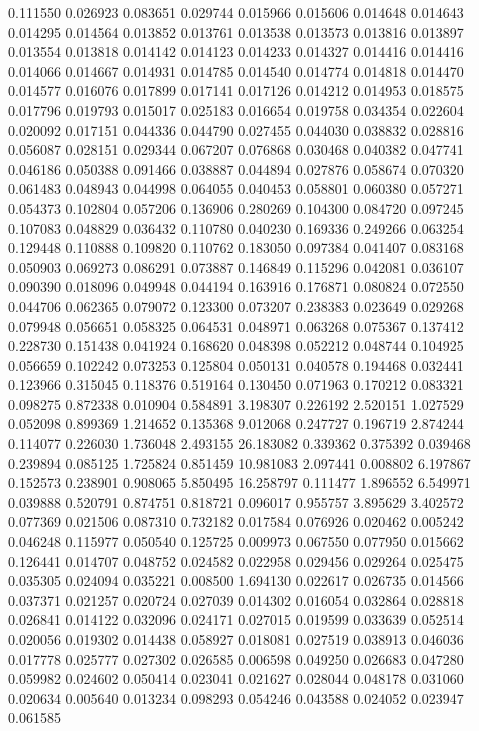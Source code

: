 0.111550
0.026923
0.083651
0.029744
0.015966
0.015606
0.014648
0.014643
0.014295
0.014564
0.013852
0.013761
0.013538
0.013573
0.013816
0.013897
0.013554
0.013818
0.014142
0.014123
0.014233
0.014327
0.014416
0.014416
0.014066
0.014667
0.014931
0.014785
0.014540
0.014774
0.014818
0.014470
0.014577
0.016076
0.017899
0.017141
0.017126
0.014212
0.014953
0.018575
0.017796
0.019793
0.015017
0.025183
0.016654
0.019758
0.034354
0.022604
0.020092
0.017151
0.044336
0.044790
0.027455
0.044030
0.038832
0.028816
0.056087
0.028151
0.029344
0.067207
0.076868
0.030468
0.040382
0.047741
0.046186
0.050388
0.091466
0.038887
0.044894
0.027876
0.058674
0.070320
0.061483
0.048943
0.044998
0.064055
0.040453
0.058801
0.060380
0.057271
0.054373
0.102804
0.057206
0.136906
0.280269
0.104300
0.084720
0.097245
0.107083
0.048829
0.036432
0.110780
0.040230
0.169336
0.249266
0.063254
0.129448
0.110888
0.109820
0.110762
0.183050
0.097384
0.041407
0.083168
0.050903
0.069273
0.086291
0.073887
0.146849
0.115296
0.042081
0.036107
0.090390
0.018096
0.049948
0.044194
0.163916
0.176871
0.080824
0.072550
0.044706
0.062365
0.079072
0.123300
0.073207
0.238383
0.023649
0.029268
0.079948
0.056651
0.058325
0.064531
0.048971
0.063268
0.075367
0.137412
0.228730
0.151438
0.041924
0.168620
0.048398
0.052212
0.048744
0.104925
0.056659
0.102242
0.073253
0.125804
0.050131
0.040578
0.194468
0.032441
0.123966
0.315045
0.118376
0.519164
0.130450
0.071963
0.170212
0.083321
0.098275
0.872338
0.010904
0.584891
3.198307
0.226192
2.520151
1.027529
0.052098
0.899369
1.214652
0.135368
9.012068
0.247727
0.196719
2.874244
0.114077
0.226030
1.736048
2.493155
26.183082
0.339362
0.375392
0.039468
0.239894
0.085125
1.725824
0.851459
10.981083
2.097441
0.008802
6.197867
0.152573
0.238901
0.908065
5.850495
16.258797
0.111477
1.896552
6.549971
0.039888
0.520791
0.874751
0.818721
0.096017
0.955757
3.895629
3.402572
0.077369
0.021506
0.087310
0.732182
0.017584
0.076926
0.020462
0.005242
0.046248
0.115977
0.050540
0.125725
0.009973
0.067550
0.077950
0.015662
0.126441
0.014707
0.048752
0.024582
0.022958
0.029456
0.029264
0.025475
0.035305
0.024094
0.035221
0.008500
1.694130
0.022617
0.026735
0.014566
0.037371
0.021257
0.020724
0.027039
0.014302
0.016054
0.032864
0.028818
0.026841
0.014122
0.032096
0.024171
0.027015
0.019599
0.033639
0.052514
0.020056
0.019302
0.014438
0.058927
0.018081
0.027519
0.038913
0.046036
0.017778
0.025777
0.027302
0.026585
0.006598
0.049250
0.026683
0.047280
0.059982
0.024602
0.050414
0.023041
0.021627
0.028044
0.048178
0.031060
0.020634
0.005640
0.013234
0.098293
0.054246
0.043588
0.024052
0.023947
0.061585
